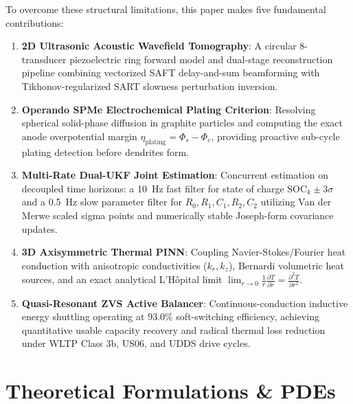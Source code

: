\documentclass[journal]{IEEEtran}
\begin{document}
To overcome these structural limitations, this paper makes five fundamental contributions:
\begin{enumerate}
    \item \textbf{2D Ultrasonic Acoustic Wavefield Tomography}: A circular 8-transducer piezoelectric ring forward model and dual-stage reconstruction pipeline combining vectorized SAFT delay-and-sum beamforming with Tikhonov-regularized SART slowness perturbation inversion.
    \item \textbf{Operando SPMe Electrochemical Plating Criterion}: Resolving spherical solid-phase diffusion in graphite particles and computing the exact anode overpotential margin $\eta_{\text{plating}} = \Phi_s - \Phi_e$, providing proactive sub-cycle plating detection before dendrites form.
    \item \textbf{Multi-Rate Dual-UKF Joint Estimation}: Concurrent estimation on decoupled time horizons: a 10~Hz fast filter for state of charge $\text{SOC}_k \pm 3\sigma$ and a 0.5~Hz slow parameter filter for $R_0, R_1, C_1, R_2, C_2$ utilizing Van der Merwe scaled sigma points and numerically stable Joseph-form covariance updates.
    \item \textbf{3D Axisymmetric Thermal PINN}: Coupling Navier-Stokes/Fourier heat conduction with anisotropic conductivities ($k_r, k_z$), Bernardi volumetric heat sources, and an exact analytical L'H\^opital limit $\lim_{r \to 0} \frac{1}{r} \frac{\partial T}{\partial r} = \frac{\partial^2 T}{\partial r^2}$.
    \item \textbf{Quasi-Resonant ZVS Active Balancer}: Continuous-conduction inductive energy shuttling operating at 93.0\% soft-switching efficiency, achieving quantitative usable capacity recovery and radical thermal loss reduction under WLTP Class 3b, US06, and UDDS drive cycles.
\end{enumerate}

\section{Theoretical Formulations \& PDEs}
\end{document}
